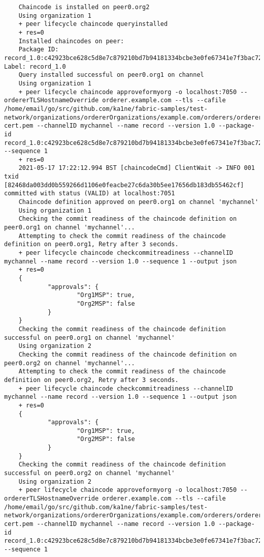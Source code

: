 \begin{lstlisting}
    Chaincode is installed on peer0.org2
    Using organization 1
    + peer lifecycle chaincode queryinstalled
    + res=0
    Installed chaincodes on peer:
    Package ID: record_1.0:c42923bce628c5d8e7c879210bd7b94181334bcbe3e0fe67341e7f3bac72d075, Label: record_1.0
    Query installed successful on peer0.org1 on channel
    Using organization 1
    + peer lifecycle chaincode approveformyorg -o localhost:7050 --ordererTLSHostnameOverride orderer.example.com --tls --cafile /home/email/go/src/github.com/ka1ne/fabric-samples/test-network/organizations/ordererOrganizations/example.com/orderers/orderer.example.com/msp/tlscacerts/tlsca.example.com-cert.pem --channelID mychannel --name record --version 1.0 --package-id record_1.0:c42923bce628c5d8e7c879210bd7b94181334bcbe3e0fe67341e7f3bac72d075 --sequence 1
    + res=0
    2021-05-17 17:22:12.994 BST [chaincodeCmd] ClientWait -> INFO 001 txid [82468da003dd0b559266d1106e0feacbe27c6da30b5ee17656db183db55462cf] committed with status (VALID) at localhost:7051
    Chaincode definition approved on peer0.org1 on channel 'mychannel'
    Using organization 1
    Checking the commit readiness of the chaincode definition on peer0.org1 on channel 'mychannel'...
    Attempting to check the commit readiness of the chaincode definition on peer0.org1, Retry after 3 seconds.
    + peer lifecycle chaincode checkcommitreadiness --channelID mychannel --name record --version 1.0 --sequence 1 --output json
    + res=0
    {
            "approvals": {
                    "Org1MSP": true,
                    "Org2MSP": false
            }
    }
    Checking the commit readiness of the chaincode definition successful on peer0.org1 on channel 'mychannel'
    Using organization 2
    Checking the commit readiness of the chaincode definition on peer0.org2 on channel 'mychannel'...
    Attempting to check the commit readiness of the chaincode definition on peer0.org2, Retry after 3 seconds.
    + peer lifecycle chaincode checkcommitreadiness --channelID mychannel --name record --version 1.0 --sequence 1 --output json
    + res=0
    {
            "approvals": {
                    "Org1MSP": true,
                    "Org2MSP": false
            }
    }
    Checking the commit readiness of the chaincode definition successful on peer0.org2 on channel 'mychannel'
    Using organization 2
    + peer lifecycle chaincode approveformyorg -o localhost:7050 --ordererTLSHostnameOverride orderer.example.com --tls --cafile /home/email/go/src/github.com/ka1ne/fabric-samples/test-network/organizations/ordererOrganizations/example.com/orderers/orderer.example.com/msp/tlscacerts/tlsca.example.com-cert.pem --channelID mychannel --name record --version 1.0 --package-id record_1.0:c42923bce628c5d8e7c879210bd7b94181334bcbe3e0fe67341e7f3bac72d075 --sequence 1

\end{lstlisting}
